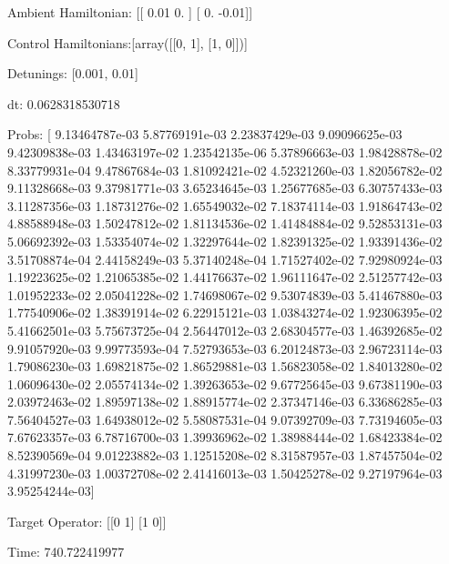 \documentclass{article}
\begin{document}
    

\newpage

Ambient Hamiltonian: [[ 0.01  0.  ]
 [ 0.   -0.01]]

Control Hamiltonians:[array([[0, 1],
       [1, 0]])]

Detunings: [0.001, 0.01]

 dt: 0.0628318530718

Probs: [  9.13464787e-03   5.87769191e-03   2.23837429e-03   9.09096625e-03
   9.42309838e-03   1.43463197e-02   1.23542135e-06   5.37896663e-03
   1.98428878e-02   8.33779931e-04   9.47867684e-03   1.81092421e-02
   4.52321260e-03   1.82056782e-02   9.11328668e-03   9.37981771e-03
   3.65234645e-03   1.25677685e-03   6.30757433e-03   3.11287356e-03
   1.18731276e-02   1.65549032e-02   7.18374114e-03   1.91864743e-02
   4.88588948e-03   1.50247812e-02   1.81134536e-02   1.41484884e-02
   9.52853131e-03   5.06692392e-03   1.53354074e-02   1.32297644e-02
   1.82391325e-02   1.93391436e-02   3.51708874e-04   2.44158249e-03
   5.37140248e-04   1.71527402e-02   7.92980924e-03   1.19223625e-02
   1.21065385e-02   1.44176637e-02   1.96111647e-02   2.51257742e-03
   1.01952233e-02   2.05041228e-02   1.74698067e-02   9.53074839e-03
   5.41467880e-03   1.77540906e-02   1.38391914e-02   6.22915121e-03
   1.03843274e-02   1.92306395e-02   5.41662501e-03   5.75673725e-04
   2.56447012e-03   2.68304577e-03   1.46392685e-02   9.91057920e-03
   9.99773593e-04   7.52793653e-03   6.20124873e-03   2.96723114e-03
   1.79086230e-03   1.69821875e-02   1.86529881e-03   1.56823058e-02
   1.84013280e-02   1.06096430e-02   2.05574134e-02   1.39263653e-02
   9.67725645e-03   9.67381190e-03   2.03972463e-02   1.89597138e-02
   1.88915774e-02   2.37347146e-03   6.33686285e-03   7.56404527e-03
   1.64938012e-02   5.58087531e-04   9.07392709e-03   7.73194605e-03
   7.67623357e-03   6.78716700e-03   1.39936962e-02   1.38988444e-02
   1.68423384e-02   8.52390569e-04   9.01223882e-03   1.12515208e-02
   8.31587957e-03   1.87457504e-02   4.31997230e-03   1.00372708e-02
   2.41416013e-03   1.50425278e-02   9.27197964e-03   3.95254244e-03]

Target Operator: [[0 1]
 [1 0]]

Time: 740.722419977
\end{document}
